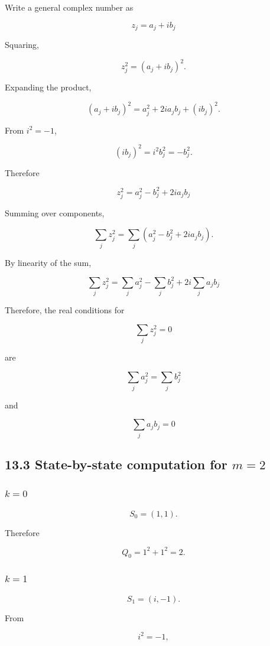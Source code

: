\documentclass[
  a4paper,
]{article}
\begin{document}
Write a general complex number as

\[
z_j
=
a_j+i b_j
\]

Squaring,

\[
z_j^2
=
(a_j+i b_j)^2.
\]

Expanding the product,

\[
(a_j+i b_j)^2
=
a_j^2+2i a_j b_j+(i b_j)^2.
\]

From \(i^2=-1\),

\[
(i b_j)^2
=
i^2 b_j^2
=
-b_j^2.
\]

Therefore

\[
\boxed{
z_j^2
=
a_j^2-b_j^2+2i a_j b_j
}
\]

Summing over components,

\[
\sum_j z_j^2
=
\sum_j(a_j^2-b_j^2+2i a_jb_j).
\]

By linearity of the sum,

\[
\boxed{
\sum_j z_j^2
=
\sum_j a_j^2
-
\sum_j b_j^2
+
2i\sum_j a_jb_j
}
\]

Therefore, the real conditions for

\[
\sum_j z_j^2=0
\]

are

\[
\sum_j a_j^2
=
\sum_j b_j^2
\]

and

\[
\sum_j a_jb_j
=
0
\]

\subsection{\texorpdfstring{13.3 State-by-state computation for
\(m=2\)}{13.3 State-by-state computation for m=2}}\label{state-by-state-computation-for-m2}

\subsubsection{\texorpdfstring{\(k=0\)}{k=0}}\label{k0-2}

\[
S_0=(1,1).
\]

Therefore

\[
Q_0
=
1^2+1^2
=
2.
\]

\subsubsection{\texorpdfstring{\(k=1\)}{k=1}}\label{k1-2}

\[
S_1=(i,-1).
\]

From

\[
i^2=-1,
\]
\end{document}
